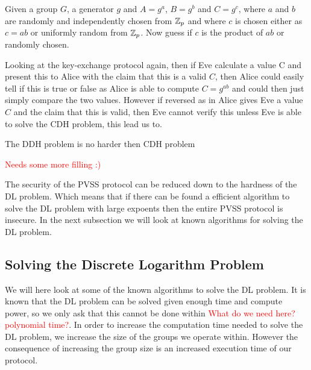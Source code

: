 \begin{defi} 
    Given a group $G$, a generator $g$ and $A = g^a$, $B = g^b$ and $C = g^c$, where $a$ and $b$ are randomly and independently chosen from $\mathbb{Z}_p$ and where $c$ is chosen either as $c = ab$ or uniformly random from $\mathbb{Z}_p$. Now guess if $c$ is the product of $ab$ or randomly chosen.   
\end{defi}

Looking at the key-exchange protocol again, then if Eve calculate a value C and present this to Alice with the claim that this is a valid $C$, then Alice could easily tell if this is true or false as Alice is able to compute $C = g^{ab}$ and could then just simply compare the two values. However if reversed as in Alice gives Eve a value $C$ and the claim that this is valid, then Eve cannot verify this unless Eve is able to solve the CDH problem, this lead us to.

\begin{lemma}
The DDH problem is no harder then CDH problem
\end{lemma}

\textcolor{red}{Needs some more filling :)}

The security of the PVSS protocol can be reduced down to the hardness of the DL problem. Which means that if there can be found a efficient algorithm to solve the DL problem with large expoents then the entire PVSS protocol is insecure. In the next subsection we will look at known algorithms for solving the DL problem. 

\subsection{Solving the Discrete Logarithm Problem}
We will here look at some of the known algorithms to solve the DL problem. It is known that the DL problem can be solved given enough time and compute power, so we only ask that this cannot be done within \textcolor{red}{What do we need here?  polynomial time?}. In order to increase the computation time needed to solve the DL problem, we increase the size of the groups we operate within. However the consequence of increasing the group size is an increased execution time of our protocol. \\

